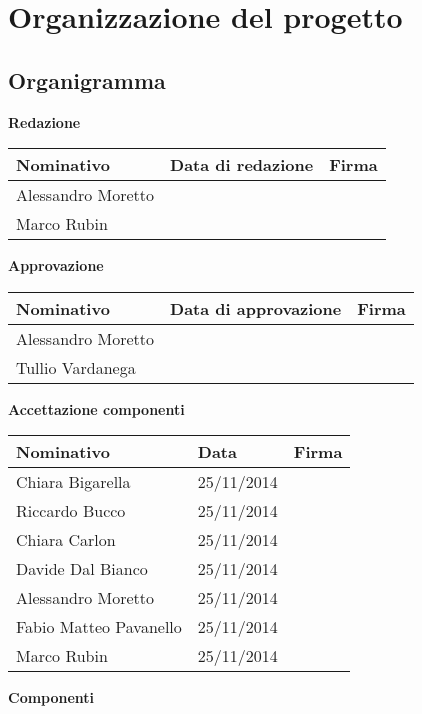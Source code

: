 \documentclass{article}
\begin{document}
	\section{Organizzazione del progetto}
	\subsection{Organigramma}
	
\textbf{Redazione}
\begin{center}
	\begin{tabular}{ | p{4cm} | p{3.5cm} | p{4cm} |}
	\hline
     Nominativo & Data di redazione & Firma \\ \hline
     Alessandro Moretto & & \\ \hline
     Marco Rubin & & \\ \hline
     \end{tabular}
	\end{center}
\textbf{Approvazione}
	\begin{center}
	\begin{tabular}{ | p{4cm} | p{3.5cm} | p{4cm} |}
	\hline
     Nominativo & Data di approvazione & Firma \\ \hline
     Alessandro Moretto & & \\ \hline
     Tullio Vardanega & & \\ \hline
     \end{tabular}
	\end{center}
\textbf{Accettazione componenti}
	\begin{center}
	\begin{tabular}{ | p{4cm} | p{2.5cm} | p{5cm} |}
	\hline
     Nominativo & Data & Firma \\ \hline
     Chiara Bigarella & 25/11/2014 & \\ \hline
     Riccardo Bucco & 25/11/2014 & \\ \hline
     Chiara Carlon & 25/11/2014 & \\ \hline
     Davide Dal Bianco & 25/11/2014 & \\ \hline
     Alessandro Moretto & 25/11/2014 & \\ \hline
     Fabio Matteo Pavanello & 25/11/2014 & \\ \hline
     Marco Rubin & 25/11/2014 & \\ \hline
     \end{tabular}
	\end{center}
	\textbf{Componenti}
\end{document}
